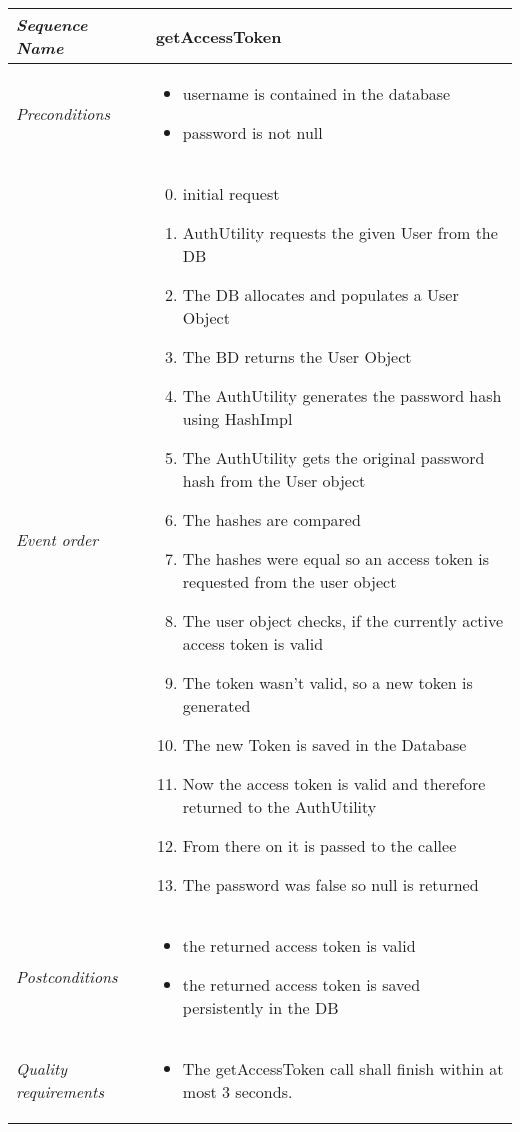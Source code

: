 				\begin{tabular}{|p{}|p{}|}
					\hline 
					\textit{Sequence Name}&\textbf{getAccessToken}\\
					\hline
					\textit{Preconditions}&
					\begin{itemize}
						\item username is contained in the database
						\item password is not null
					\end{itemize}\\
					\hline
					\textit{Event order}&
					\begin{enumerate}[1.]
						\setcounter{enumi}{-1}
						\item initial request
						\item AuthUtility requests the given User from the DB
						\item The DB allocates and populates a User Object
						\item The BD returns the User Object
						\item The AuthUtility generates the password hash using HashImpl
						\addtocounter{enumi}{1}
						\item The AuthUtility gets the original password hash from the User object
						\addtocounter{enumi}{1}
						\item The hashes are compared
						\item The hashes were equal so an access token is requested from the user object
						\item The user object checks, if the currently active access token is valid
						\item The token wasn't valid, so a new token is generated
						\item The new Token is saved in the Database
						\item Now the access token is valid and therefore returned to the AuthUtility
						\item From there on it is passed to the callee
						\item The password was false so null is returned
					\end{enumerate}\\
					\hline
					\textit{Postconditions}&
					\begin{itemize}
						\item the returned access token is valid
						\item the returned access token is saved persistently in the DB
					\end{itemize}\\
					\hline
					\textit{Quality requirements}&
					\begin{itemize}
						\item The getAccessToken call shall finish within at most 3 seconds.
					\end{itemize}\\
					\hline
				\end{tabular}

